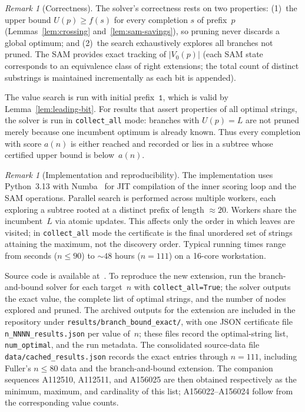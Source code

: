 \documentclass[11pt,a4paper]{article}
\theoremstyle{plain}
\theoremstyle{definition}
\theoremstyle{remark}
\newtheorem{remark}[theorem]{Remark}
\begin{document}
\begin{remark}[Correctness]
  The solver's correctness rests on two properties: (1)~the upper
  bound $U(p) \ge f(s)$ for every completion $s$ of prefix~$p$
  (Lemmas~\ref{lem:crossing} and~\ref{lem:sam-savings}), so pruning
  never discards a global optimum; and (2)~the search exhaustively
  explores all branches not pruned.  The SAM provides exact tracking
  of $|V_0(p)|$ (each SAM state corresponds to an equivalence class
  of right extensions; the total count of distinct substrings is
  maintained incrementally as each bit is appended).

  The value search is run with initial prefix~$\mathtt{1}$, which is
  valid by Lemma~\ref{lem:leading-bit}.  For results that assert
  properties of all optimal strings, the solver is run in
  \texttt{collect\_all} mode: branches with $U(p)=L$ are not pruned
  merely because one incumbent optimum is already known.  Thus every
  completion with score $a(n)$ is either reached and recorded or lies
  in a subtree whose certified upper bound is below~$a(n)$.
\end{remark}

\begin{remark}[Implementation and reproducibility]
  The implementation uses Python~3.13 with Numba~\cite{numba}
  for JIT compilation of the inner scoring loop and the SAM
  operations.  Parallel search is performed across multiple workers,
  each exploring a subtree rooted at a distinct prefix of length
  $\approx 20$.  Workers share the incumbent~$L$ via atomic updates.
  This affects only the order in which leaves are visited; in
  \texttt{collect\_all} mode the certificate is the final unordered set
  of strings attaining the maximum, not the discovery order.
  Typical running times range from seconds ($n \le 90$) to
  $\sim\!48$ hours ($n = 111$) on a 16-core workstation.

  Source code is available at~\cite{github}.  To reproduce the new
  extension, run the branch-and-bound solver for each target~$n$ with
  \texttt{collect\_all=True}; the solver outputs the exact value, the
  complete list of optimal strings, and the number of nodes explored
  and pruned.  The archived outputs for the extension are included in
  the repository under \texttt{results/branch\_bound\_exact/}, with one
  JSON certificate file \texttt{n\_NNNN\_results.json} per value of~$n$;
  these files record the optimal-string list, \texttt{num\_optimal}, and
  the run metadata.  The consolidated source-data file
  \texttt{data/cached\_results.json} records the exact entries through
  $n=111$, including Fuller's $n\le80$ data and the branch-and-bound
  extension.  The companion sequences A112510, A112511, and A156025 are
  then obtained respectively as the minimum, maximum, and cardinality of
  this list; A156022--A156024 follow from the corresponding value counts.
\end{remark}
\end{document}
